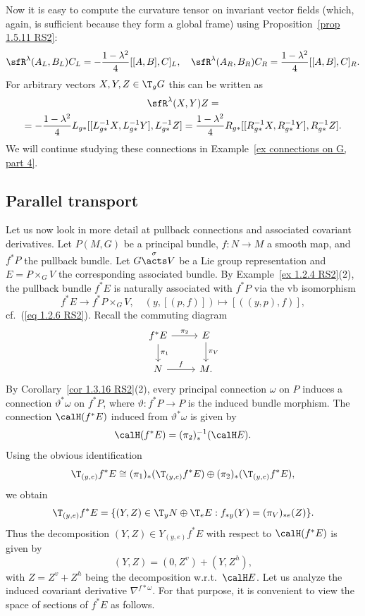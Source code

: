 \begin{example}
    Now it is easy to compute the curvature tensor on invariant vector fields (which, again, is sufficient because they form a global frame) using Proposition~\ref{prop 1.5.11 RS2}:
    \[\sfR^\lambda(A_L,B_L)C_L=-\frac{1-\lambda^2}{4}[[A,B],C]_L,\quad \sfR^\lambda(A_R,B_R)C_R=\frac{1-\lambda^2}{4}[[A,B],C]_R.\]
    For arbitrary vectors $X,Y,Z\in \T_g G$ this can be written as
    \begin{multline}
        \sfR^\lambda(X,Y)Z=\\=-\frac{1-\lambda^2}{4}L_{g\ast}[[L_{g\ast}^{-1}X,L_{g\ast}^{-1}Y],L_{g\ast}^{-1}Z]=\frac{1-\lambda^2}{4}R_{g\ast}[[R_{g\ast}^{-1}X,R_{g\ast}^{-1}Y],R_{g\ast}^{-1}Z].
    \end{multline}
    We will continue studying these connections in Example~\ref{ex connections on G, part 4}.
\end{example}









\subsection{Parallel transport}


Let us now look in more detail at pullback connections and associated covariant derivatives. Let $P(M,G)$ be a principal bundle, $f:N\to M$ a smooth map, and $f^\ast P$ the pullback bundle. Let $G\overset{\sigma}{\acts}V$ be a Lie group representation and $E=P\times_G V$ the corresponding associated bundle. By Example~\ref{ex 1.2.4 RS2}(2), the pullback bundle $f^\ast E$ is naturally associated with $f^\ast P$ via the \gls{vb} isomorphism
\[f^\ast E\to f^\ast P\times_G V,\quad (y,[(p,f)])\mapsto [((y,p),f)],\]
cf.\ (\ref{eq 1.2.6 RS2}). 
Recall the commuting diagram
\[\begin{tikzcd}
    f^\ast E\arrow[r,"\pi_2"]\arrow[d,"\pi_1"]& E\arrow[d,"\pi_V"]\\
    N\arrow[r,"f"]&M.
\end{tikzcd}\]
By Corollary~\ref{cor 1.3.16 RS2}(2), every principal connection $\omega$ on $P$ induces a connection $\vartheta^\ast\omega$ on $f^\ast P$, where $\vartheta: f^\ast P\to P$ is the induced bundle morphism. The connection $\calH (f^\ast E)$ induced from $\vartheta^\ast\omega$ is given by
\[\calH (f^\ast E)=(\pi_2)_\ast^{-1}(\calH E).\]
Using the obvious identification
\[\T_{(y,e)}f^\ast E\cong (\pi_1)_\ast (\T_{(y,e)}f^\ast E)\oplus (\pi_2)_\ast(\T_{(y,e)}f^\ast E),\]
we obtain
\[\T_{(y,e)}f^\ast E=\{(Y,Z)\in \T_y N\oplus \T_e E:f_{\ast y}(Y)=(\pi_V)_{\ast e}(Z)\}.\]
Thus the decomposition $(Y,Z)\in Y_{(y,e)}f^\ast E$ with respect to $\calH (f^\ast E)$ is given by
\[(Y,Z)=(0,Z^v)+(Y,Z^h),\label{eq 1.5.15 RS2}\]
with $Z=Z^v+Z^h$ being the decomposition w.r.t.\ $\calH E$. Let us analyze the induced covariant derivative $\nabla^{f\ast \omega}$. For that purpose, it is convenient to view the space of sections of $f^\ast E$ as follows.

